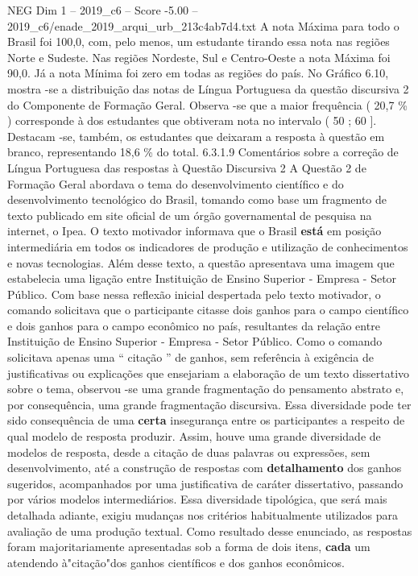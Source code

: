\begin{textsample}{NEG Dim 1 – 2019\_c6 – Score -5.00 – 2019\_c6/enade\_2019\_arqui\_urb\_213c4ab7d4.txt}
A nota Máxima para todo o Brasil foi 100,0, com, pelo menos, um estudante tirando essa nota nas regiões Norte e Sudeste.
Nas regiões Nordeste, Sul e Centro-Oeste a nota Máxima foi 90,0.
Já a nota Mínima foi zero em todas as regiões do país.
No Gráfico 6.10, mostra -se a distribuição das notas de Língua Portuguesa da questão discursiva 2 do Componente de Formação Geral.
Observa -se que a maior frequência ( 20,7 \% ) corresponde à dos estudantes que obtiveram nota no intervalo ( 50 ; 60 ].
Destacam -se, também, os estudantes que deixaram a resposta à questão em branco, representando 18,6 \% do total. 6.3.1.9 Comentários sobre a correção de Língua Portuguesa das respostas à Questão Discursiva 2 A Questão 2 de Formação Geral abordava o tema do desenvolvimento científico e do desenvolvimento tecnológico do Brasil, tomando como base um fragmento de texto publicado em site oficial de um órgão governamental de pesquisa na internet, o Ipea.
O texto motivador informava que o Brasil \textbf{está} em posição intermediária em todos os indicadores de produção e utilização de conhecimentos e novas tecnologias.
Além desse texto, a questão apresentava uma imagem que estabelecia uma ligação entre Instituição de Ensino Superior - Empresa - Setor Público.
Com base nessa reflexão inicial despertada pelo texto motivador, o comando solicitava que o participante citasse dois ganhos para o campo científico e dois ganhos para o campo econômico no país, resultantes da relação entre Instituição de Ensino Superior - Empresa - Setor Público.
Como o comando solicitava apenas uma “ citação ” de ganhos, sem referência à exigência de justificativas ou explicações que ensejariam a elaboração de um texto dissertativo sobre o tema, observou -se uma grande fragmentação do pensamento abstrato e, por consequência, uma grande fragmentação discursiva.
Essa diversidade pode ter sido consequência de uma \textbf{certa} insegurança entre os participantes a respeito de qual modelo de resposta produzir.
Assim, houve uma grande diversidade de modelos de resposta, desde a citação de duas palavras ou expressões, sem desenvolvimento, até a construção de respostas com \textbf{detalhamento} dos ganhos sugeridos, acompanhados por uma justificativa de caráter dissertativo, passando por vários modelos intermediários.
Essa diversidade tipológica, que será mais detalhada adiante, exigiu mudanças nos critérios habitualmente utilizados para avaliação de uma produção textual.
Como resultado desse enunciado, as respostas foram majoritariamente apresentadas sob a forma de dois itens, \textbf{cada} um atendendo à"citação"dos ganhos científicos e dos ganhos econômicos.

\end{textsample}
